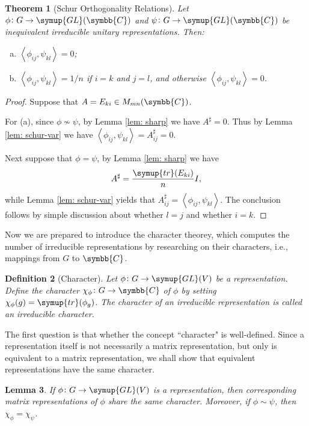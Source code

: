 \documentclass{assignment}[2019/10/15]
\newcommand{\lr}[3]{\left#1#3\right#2}
\theoremstyle{plain}
\newtheorem{theorem}{Theorem}[section]
\newtheorem{definition}[theorem]{Definition}
\newtheorem{lemma}[theorem]{Lemma}
\newcommand{\BC}{\symbb{C}}
\newcommand{\GL}{\mathop{}\!\symup{GL}}
\newcommand{\tr}{\mathop{}\!\symup{tr}}
\numberwithin{equation}{section}
\begin{document}
    \begin{theorem}[Schur Orthogonality Relations]
        Let $\phi\colon G\to \GL(\BC)$ and $\psi\colon G\to \GL(\BC)$ be inequivalent irreducible unitary representations. Then:
        \begin{enumerate}[(a)]
            \item $\lr<>{\phi_{ij}, \psi_{kl}} = 0$;
            \item $\lr<>{\phi_{ij}, \psi_{kl}} = 1/n$ if $i=k$ and $j=l$, and otherwise $\lr<>{\phi_{ij}, \psi_{kl}} = 0$.
        \end{enumerate}
    \end{theorem}

    \begin{proof}
        Suppose that $A = E_{ki}\in M_{mn}(\BC)$.

        For (a), since $\phi\nsim\psi$, by Lemma \ref{lem: sharp} we have $A^\sharp = 0$. Thus by Lemma \ref{lem: schur-var} we have $\lr<>{\phi_{ij}, \psi_{kl}} = A^\sharp_{ij}= 0$.

        Next suppose that $\phi=\psi$, by Lemma \ref{lem: sharp} we have
        \begin{equation}
            A^\sharp = \frac{\tr(E_{ki})}{n}I,
        \end{equation}
        while Lemma \ref{lem: schur-var} yields that $A_{ij}^\sharp =  \lr<>{\phi_{ij}, \psi_{kl}}$. The conclusion follows by simple discussion about whether $l=j$ and whether $i=k$.
    \end{proof}

    Now we are prepared to introduce the character theorey, which computes the number of irreducible representations by researching on their characters, i.e., mappings from $G$ to $\BC$.

    \begin{definition}[Character]
        Let $\phi\colon G\to \GL(V)$ be a representation. Define the \emph{character} $\chi_{\phi}\colon G\to \BC$ of $\phi$ by setting $\chi_\phi(g)=\tr(\phi_g)$. The character of an irreducible representation is called an \emph{irreducible character}.
    \end{definition}

    The first question is that whether the concept ``character" is well-defined. Since a representation itself is not necessarily a matrix representation, but only is equivalent to a matrix representation, we shall show that equivalent representations have the same character.

    \begin{lemma}\label{lem: char-wd}
        If $\phi\colon G\to \GL(V)$ is a representation, then corresponding matrix representations of $\phi$ share the same character. Moreover, if $\phi\sim\psi$, then $\chi_\phi=\chi_\psi$.
    \end{lemma}
\end{document}

